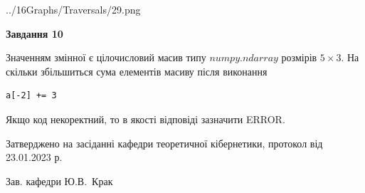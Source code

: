 \documentclass[12pt, ukrainian]{article}
\begin{document}
{\begin {large}
\begin{center}
	{../16Graphs/Traversals/29.png}
\end{center}\par
\newpage

{\begin {center}\textbf{Завдання 10}\end {center}}\par
Значенням змінної  є цілочисловий масив типу $numpy.ndarray$ розмірів $5{\times}3$. На скільки збільшиться сума елементів масиву  після виконання
\begin{verbatim}
a[-2] += 3
\end{verbatim}


Якщо код некоректний, то в якості відповіді зазначити ERROR.\par
\newpage


\end {large}
}
{\smallskip \begin {small} Затверджено на засіданні кафедри теоретичної кібернетики, протокол  від   23.01.2023 р.\par\smallskip\smallskip
{\parbox {6.5 cm}{Зав. кафедри \dotfill Ю.В.~Крак}} \end{small}}
\end{document}
